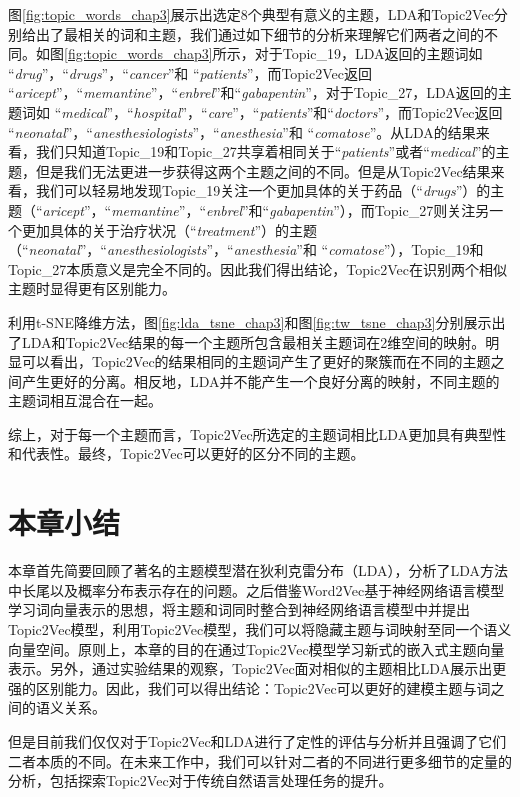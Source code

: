 \documentclass[master]{njuthesis}
\begin{document}
图\ref{fig:topic_words_chap3}展示出选定8个典型有意义的主题，LDA和Topic2Vec分别给出了最相关的词和主题，我们通过如下细节的分析来理解它们两者之间的不同。如图\ref{fig:topic_words_chap3}所示，对于Topic\_19，LDA返回的主题词如 ``{\it drug}''，``{\it drugs}''，``{\it cancer}''和 ``{\it patients}''，而Topic2Vec返回 ``{\it aricept}''，``{\it memantine}''，``{\it enbrel}''和``{\it gabapentin}''，对于Topic\_27，LDA返回的主题词如 ``{\it medical}''，``{\it hospital}''，``{\it care}''，``{\it patients}''和``{\it doctors}''，而Topic2Vec返回 ``{\it neonatal}''，``{\it anesthesiologists}''，``{\it anesthesia}''和 ``{\it comatose}''。从LDA的结果来看，我们只知道Topic\_19和Topic\_27共享着相同关于``{\it patients}''或者``{\it medical}''的主题，但是我们无法更进一步获得这两个主题之间的不同。但是从Topic2Vec结果来看，我们可以轻易地发现Topic\_19关注一个更加具体的关于药品（``{\it drugs}''）的主题（``{\it aricept}''，``{\it memantine}''，``{\it enbrel}''和``{\it gabapentin}''），而Topic\_27则关注另一个更加具体的关于治疗状况（``{\it treatment}''）的主题（``{\it neonatal}''，``{\it anesthesiologists}''，``{\it anesthesia}''和 ``{\it comatose}''），Topic\_19和Topic\_27本质意义是完全不同的。因此我们得出结论，Topic2Vec在识别两个相似主题时显得更有区别能力。

利用t-SNE降维方法，图\ref{fig:lda_tsne_chap3}和图\ref{fig:tw_tsne_chap3}分别展示出了LDA和Topic2Vec结果的每一个主题所包含最相关主题词在2维空间的映射。明显可以看出，Topic2Vec的结果相同的主题词产生了更好的聚簇而在不同的主题之间产生更好的分离。相反地，LDA并不能产生一个良好分离的映射，不同主题的主题词相互混合在一起。

综上，对于每一个主题而言，Topic2Vec所选定的主题词相比LDA更加具有典型性和代表性。最终，Topic2Vec可以更好的区分不同的主题。

\section{本章小结}\label{sec_chap3_conslusions}

本章首先简要回顾了著名的主题模型潜在狄利克雷分布（LDA），分析了LDA方法中长尾以及概率分布表示存在的问题。之后借鉴Word2Vec基于神经网络语言模型学习词向量表示的思想，将主题和词同时整合到神经网络语言模型中并提出Topic2Vec模型，利用Topic2Vec模型，我们可以将隐藏主题与词映射至同一个语义向量空间。原则上，本章的目的在通过Topic2Vec模型学习新式的嵌入式主题向量表示。另外，通过实验结果的观察，Topic2Vec面对相似的主题相比LDA展示出更强的区别能力。因此，我们可以得出结论：Topic2Vec可以更好的建模主题与词之间的语义关系。

但是目前我们仅仅对于Topic2Vec和LDA进行了定性的评估与分析并且强调了它们二者本质的不同。在未来工作中，我们可以针对二者的不同进行更多细节的定量的分析，包括探索Topic2Vec对于传统自然语言处理任务的提升。
\end{document}
